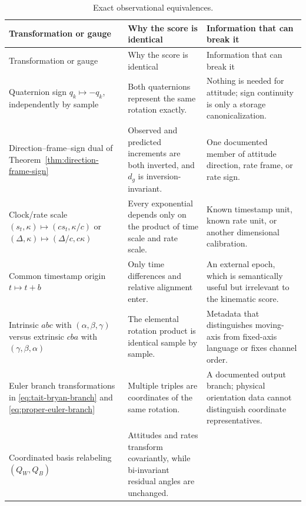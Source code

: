 \documentclass[11pt]{article}
\begin{document}
    \begingroup
    \small
    \setlength{\tabcolsep}{3.5pt}
    \begin{longtable}{@{}p{}p{}p{}@{}}
        \caption{Exact observational equivalences.}\label{tab:exact-equivalences}\\
        \toprule
        Transformation or gauge & Why the score is identical & Information that can break it \\
        \midrule
        \endfirsthead
        \toprule
        Transformation or gauge & Why the score is identical & Information that can break it \\
        \midrule
        \endhead
        \bottomrule
        \endlastfoot
        Quaternion sign $q_k\mapsto-q_k$, independently by sample
        & Both quaternions represent the same rotation exactly.
        & Nothing is needed for attitude; sign continuity is only a storage canonicalization. \\
        Direction--frame--sign dual of Theorem~\ref{thm:direction-frame-sign}
        & Observed and predicted increments are both inverted, and $d_g$ is inversion-invariant.
        & One documented member of attitude direction, rate frame, or rate sign. \\
        Clock/rate scale $(s_t,\kappa)\mapsto(cs_t,\kappa/c)$ or
        $(\Delta,\kappa)\mapsto(\Delta/c,c\kappa)$
        & Every exponential depends only on the product of time scale and rate scale.
        & Known timestamp unit, known rate unit, or another dimensional calibration. \\
        Common timestamp origin $t\mapsto t+b$
        & Only time differences and relative alignment enter.
        & An external epoch, which is semantically useful but irrelevant to the kinematic score. \\
        Intrinsic $abc$ with $(\alpha,\beta,\gamma)$ versus extrinsic $cba$ with
        $(\gamma,\beta,\alpha)$
        & The elemental rotation product is identical sample by sample.
        & Metadata that distinguishes moving-axis from fixed-axis language or fixes channel order. \\
        Euler branch transformations in \eqref{eq:tait-bryan-branch} and
        \eqref{eq:proper-euler-branch}
        & Multiple triples are coordinates of the same rotation.
        & A documented output branch; physical orientation data cannot distinguish coordinate representatives. \\
        Coordinated basis relabeling $(Q_W,Q_B)$
        & Attitudes and rates transform covariantly, while bi-invariant residual angles are unchanged.

\end{longtable}
\end{document}
